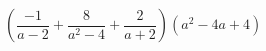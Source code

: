\begin{ex}[type=expression]
	\begin{condition}
		\( \left( \dfrac{-1}{a-2}+\dfrac{8}{a^2-4}+\dfrac{2}{a+2} \right) (a^2-4a+4)\)
	\end{condition}
\end{ex}
